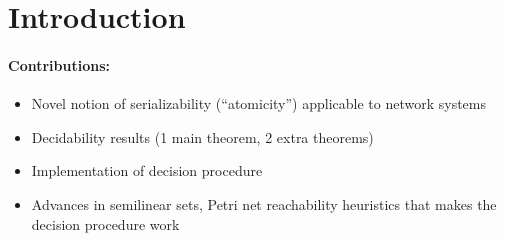 \section{Introduction}
\label{sec:introduction}






\paragraph{Contributions:}
\begin{itemize}
    \item Novel notion of serializability (``atomicity'') applicable to network systems
    \item Decidability results (1 main theorem, 2 extra theorems)
    \item Implementation of decision procedure
    \item Advances in semilinear sets, Petri net reachability heuristics that makes the decision procedure work
\end{itemize}
